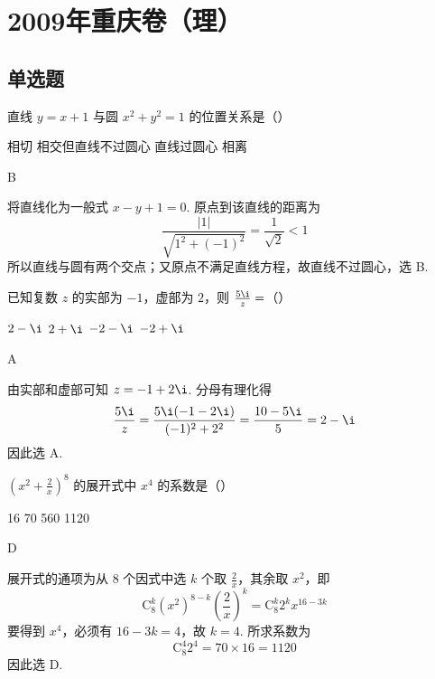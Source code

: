 \chapter{2009年重庆卷（理）}

\section{单选题}

\begin{problem}
直线 \( y = x + 1 \) 与圆 \( x^{2} + y^{2} = 1 \) 的位置关系是（\quad）

\choices
    {相切}
    {相交但直线不过圆心}
    {直线过圆心}
    {相离}

\begin{answer}
B
\end{answer}

\begin{solution}
将直线化为一般式 \(x-y+1=0\). 原点到该直线的距离为
\[
\frac{|1|}{\sqrt{1^{2}+(-1)^{2}}}=\frac{1}{\sqrt{2}}<1
\]
所以直线与圆有两个交点；又原点不满足直线方程，故直线不过圆心，选 B.
\end{solution}
\end{problem}

\begin{problem}
已知复数 \(z\) 的实部为 \(-1\)，虚部为 \(2\)，则 \(\frac{5\i}{z}=\)（\quad）

\choices
    {\(2 - \i\)}
    {\(2 + \i\)}
    {\(-2 - \i\)}
    {\(-2 + \i\)}

\begin{answer}
A
\end{answer}

\begin{solution}
由实部和虚部可知 \(z=-1+2\i\). 分母有理化得
\[
\frac{5\i}{z}=\frac{5\i(-1-2\i)}{(-1)^{2}+2^{2}}
=\frac{10-5\i}{5}=2-\i
\]
因此选 A.
\end{solution}
\end{problem}

\begin{problem}
\(\left(x^{2} + \frac{2}{x}\right)^{8}\) 的展开式中 \(x^{4}\) 的系数是（\quad）

\choices
    {16}
    {70}
    {560}
    {1120}

\begin{answer}
D
\end{answer}

\begin{solution}
展开式的通项为从 8 个因式中选 \(k\) 个取 \(\frac{2}{x}\)，其余取 \(x^{2}\)，即
\[
\mathrm C_{8}^{k}(x^{2})^{8-k}\left(\frac{2}{x}\right)^{k}
=\mathrm C_{8}^{k}2^{k}x^{16-3k}
\]
要得到 \(x^{4}\)，必须有 \(16-3k=4\)，故 \(k=4\). 所求系数为
\[
\mathrm C_{8}^{4}2^{4}=70\times16=1120
\]
因此选 D.
\end{solution}
\end{problem}

